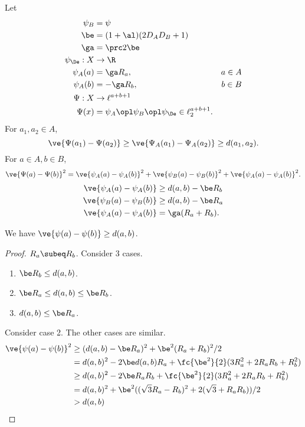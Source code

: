 Let 
\begin{align}
\psi_B&=\psi\\ %
\be&=(1+\al)(2D_AD_B+1)\\
\ga &= \prc2\be\\
\psi_\De:X&\to \R\\
\psi_A(a)&=\ga R_a,&a\in A\\
\psi_A(b)&=-\ga R_b,&b\in B\\
\Psi:X&\to \ell^{a+b+1}\\
\Psi(x)&=\psi_A\opl \psi_B \opl \psi_\De \in \ell_2^{a+b+1}.
\end{align}
For $a_1,a_2\in A$,
\[
\ve{\Psi(a_1)-\Psi(a_2)} \ge \ve{\Psi_A(a_1)-\Psi_A(a_2)} \ge d(a_1,a_2).
\]
For $a\in A,b\in B$,
\[
\ve{\Psi(a)-\Psi(b)}^2 =\ve{\psi_A(a) - \psi_A(b)}^2 + \ve{\psi_B(a)-\psi_B(b)}^2 + \ve{\psi_A(a)-\psi_A(b)}^2.
\]
\begin{align}
\ve{\psi_A(a)-\psi_A(b)} &\ge d(a,b)-\be R_b\\
\ve{\psi_B(a)-\psi_B(b)} &\ge d(a,b)-\be R_a\\
\ve{\psi_A(a)-\psi_A(b)} &= \ga (R_a+R_b).
\end{align}
\begin{clm}
We have $\ve{\psi(a)-\psi(b)} \ge d(a,b)$. 
\end{clm}
\begin{proof}
\Wog{} $R_a\subeq R_b$. Consider 3 cases.
\begin{enumerate}
\item
$\be R_b \le d(a,b) $.
\item
$\be R_a \le d(a,b) \le \be R_b$.
\item
$d(a,b)\le \be R_a$.
\end{enumerate}
Consider case 2. The other cases are similar.
\begin{align}
\ve{\psi(a)-\psi(b)}^2 & \ge (d(a,b)-\be R_a)^2 + \be^2 (R_a+R_b)^2/2\\
&=d(a,b)^2 - 2\be d(a,b) R_a + \fc{\be^2}{2} (3R_a^2 + 2R_aR_b+R_b^2)\\
&\ge d(a,b)^2 - 2\be R_aR_b +\fc{\be^2}{2} (3R_a^2 + 2R_aR_b+R_b^2)\\
& = d(a,b)^2 + \be^2 ((\sqrt 3 R_a-R_b)^2 + 2(\sqrt 3 + R_aR_b))/2\\
&> d(a,b)
\end{align}

\end{proof}


